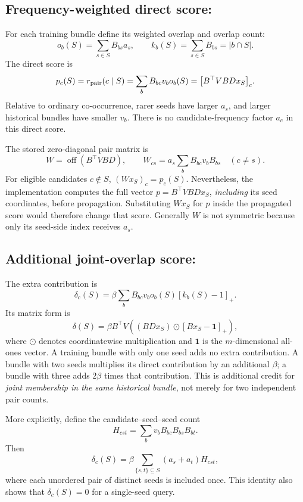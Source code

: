 \documentclass[11pt,a4paper]{article}
\newcommand{\off}{\operatorname{off}}
\DeclareRobustCommand{\key}[1]{\texttt{\detokenize{#1}}}
\newcommand{\ind}{\mathbf 1}
\begin{document}
\subsection{Frequency-weighted direct score: \key{pair}}
For each training bundle define its weighted overlap and overlap count:
\[
 o_b(S)=\sum_{s\in S}B_{bs}a_s,\qquad
 k_b(S)=\sum_{s\in S}B_{bs}=|b\cap S|.
\]
The direct score is
\begin{equation}\label{eq:pair}
 p_c(S)=r_{\rm pair}(c\mid S)
 =\sum_b B_{bc}v_bo_b(S)
 =\bigl[B^\top VBDx_S\bigr]_c.
\end{equation}
Relative to ordinary co-occurrence, rarer seeds have larger $a_s$, and larger
historical bundles have smaller $v_b$. There is no candidate-frequency factor
$a_c$ in this direct score.

The stored zero-diagonal pair matrix is
\[
 W=\off(B^\top VBD),\qquad
 W_{cs}=a_s\sum_b B_{bc}v_bB_{bs}\quad(c\ne s).
\]
For eligible candidates $c\notin S$, $(Wx_S)_c=p_c(S)$. Nevertheless, the
implementation computes the full vector $p=B^\top VBDx_S$, \emph{including}
its seed coordinates, before propagation. Substituting $Wx_S$ for $p$ inside
the propagated score would therefore change that score. Generally $W$ is not
symmetric because only its seed-side index receives $a_s$.

\subsection{Additional joint-overlap score: \key{delta_inc}}
The extra contribution is
\begin{equation}\label{eq:delta}
 \delta_c(S)=\beta\sum_b B_{bc}v_bo_b(S)[k_b(S)-1]_+.
\end{equation}
Its matrix form is
\[
 \delta(S)=\beta B^\top V
 \left((BDx_S)\odot[Bx_S-\ind]_+\right),
\]
where $\odot$ denotes coordinatewise multiplication and $\ind$ is the
$m$-dimensional all-ones vector. A training bundle with only one seed adds
no extra contribution. A bundle with two seeds multiplies its direct
contribution by an additional $\beta$; a bundle with three adds $2\beta$ times
that contribution. This is additional credit for \emph{joint membership in
the same historical bundle}, not merely for two independent pair counts.

More explicitly, define the candidate--seed--seed count
\[
 H_{cst}=\sum_b v_bB_{bc}B_{bs}B_{bt}.
\]
Then
\begin{equation}
 \delta_c(S)=\beta\sum_{\{s,t\}\subseteq S}(a_s+a_t)H_{cst},
\end{equation}
where each unordered pair of distinct seeds is included once. This identity
also shows that $\delta_c(S)=0$ for a single-seed query.
\end{document}
